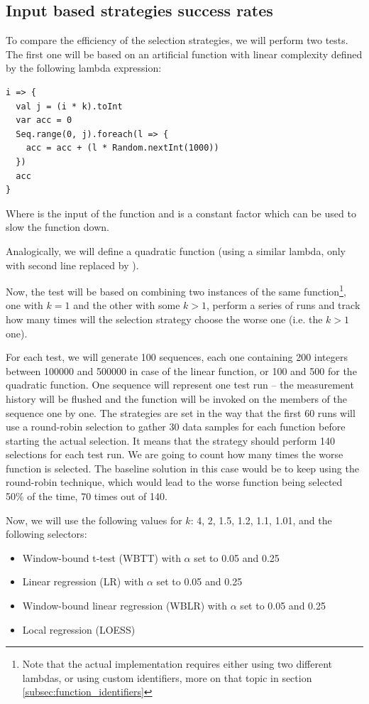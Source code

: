 \subsection{Input based strategies success rates}
\label{subsec:input_based_strategies_success}

To compare the efficiency of the selection strategies, we will perform two tests. The first one will be based on an artificial function with linear complexity defined by the following lambda expression:

\lstset{style=Scala}
\begin{lstlisting}
i => {
  val j = (i * k).toInt
  var acc = 0
  Seq.range(0, j).foreach(l => {
    acc = acc + (l * Random.nextInt(1000))
  })
  acc
}
\end{lstlisting}

Where  is the input of the function and  is a constant factor which can be used to slow the function down.

Analogically, we will define a quadratic function (using a similar lambda, only with second line replaced by ).

Now, the test will be based on combining two instances of the same function\footnote{Note that the actual implementation requires either using two different lambdas, or using custom identifiers, more on that topic in section \ref{subsec:function_identifiers}}, one with $k=1$ and the other with some $k>1$, perform a series of runs and track how many times will the selection strategy choose the worse one (i.e. the $k>1$ one).

For each test, we will generate 100 sequences, each one containing 200 integers between 100000 and 500000 in case of the linear function, or 100 and 500 for the quadratic function. One sequence will represent one test run -- the measurement history will be flushed and the function will be invoked on the members of the sequence one by one. The strategies are set in the way that the first 60 runs will use a round-robin selection to gather 30 data samples for each function before starting the actual selection. It means that the strategy should perform 140 selections for each test run. We are going to count how many times the worse function is selected. The baseline solution in this case would be to keep using the round-robin technique, which would lead to the worse function being selected 50\% of the time, 70 times out of 140.

Now, we will use the following values for $k$: 4, 2, 1.5, 1.2, 1.1, 1.01, and the following selectors:
\begin{itemize}
	\item Window-bound t-test (WBTT) with $\alpha$ set to 0.05 and 0.25
	\item Linear regression (LR) with $\alpha$ set to 0.05 and 0.25
	\item Window-bound linear regression (WBLR) with $\alpha$ set to 0.05 and 0.25
	\item Local regression (LOESS)
\end{itemize}


